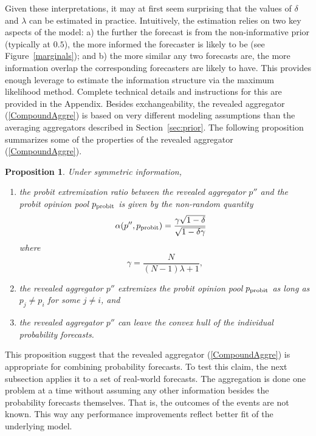 \documentclass[11pt]{article}
\newtheorem{proposition}[theorem]{Proposition}
\theoremstyle{definition}
\theoremstyle{definition}
\def\probit{p_{\rm probit}}
\begin{document}
Given these interpretations, it may at first seem surprising that 
the values of $\delta$ and $\lambda$ can be estimated in practice. 
Intuitively, the estimation relies on two key aspects of the model: 
a) the further the forecast is from the non-informative prior 
(typically at $0.5$), the more informed the forecaster is likely to be 
(see Figure~\ref{marginals}); and b) the more similar any two forecasts 
are, the more information overlap the corresponding forecasters are likely 
to have. This provides enough leverage to estimate the information structure   
via the maximum likelihood method.  Complete technical details and 
instructions for this are provided in the Appendix.  Besides exchangeability, 
the revealed aggregator (\ref{CompoundAggre}) is based on 
very different modeling assumptions than the averaging aggregators 
described in Section~\ref{sec:prior}. The following proposition summarizes some of the properties of the revealed aggregator (\ref{CompoundAggre}). 

\begin{proposition} \label{positiveThm}
Under symmetric information, 
\begin{enumerate}
\item[$(i)$] the probit extremization ratio between the revealed aggregator $p''$ and the probit opinion pool $\probit$ is given by the non-random quantity
\begin{align*}
\alpha(p'', \probit)
 &=  \frac{\gamma \sqrt{1 - \delta}}{\sqrt{1-\delta\gamma}}
\end{align*}
where 
$$\gamma = \frac{N}{(N-1)\lambda +1},$$
\item[$(ii)$] the revealed aggregator $p''$ extremizes the probit opinion 
pool $\probit$ as long as $p_j \neq p_i$ for some $j \neq i$, and
\item[$(iii)$] the revealed aggregator $p''$ can leave the convex hull of the 
individual probability forecasts. 
\end{enumerate}
\end{proposition}
This proposition suggest that the revealed aggregator (\ref{CompoundAggre}) is appropriate 
for combining probability forecasts. To test this claim, the next subsection applies it to a set of real-world forecasts. The aggregation is done one problem at a time without assuming any other information besides the probability forecasts themselves. That is, the outcomes of the events are not known. This way any performance improvements reflect better fit of the underlying model. 
\end{document}
